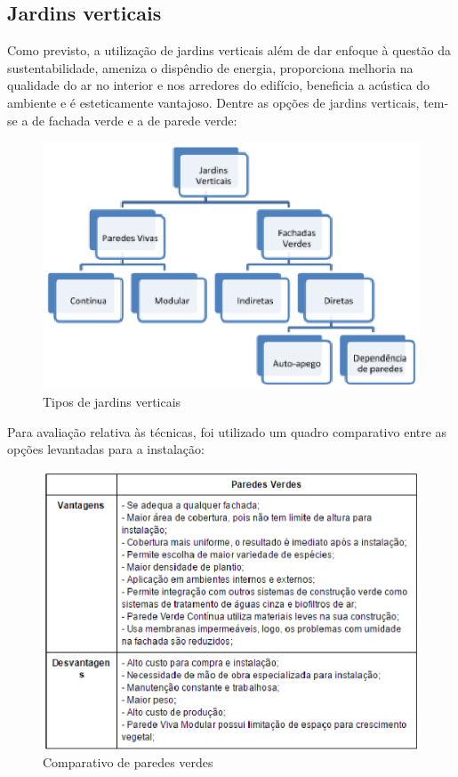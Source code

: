 \subsection{Jardins verticais}
Como previsto, a utilização de jardins verticais além de dar enfoque à questão da sustentabilidade, ameniza o dispêndio de energia, proporciona melhoria na qualidade do ar no interior e nos arredores do edifício, beneficia a acústica do ambiente e é esteticamente vantajoso. Dentre as opções de jardins verticais, tem-se a de fachada verde e a de parede verde:

\begin{figure}[!h]
  \centering
  \includegraphics[keepaspectratio=true,scale=1]{figuras/jardimvertical.eps}
  \caption{Tipos de jardins verticais}
  \label{fig:tipos_jardins_verticais}
\end{figure}

Para avaliação relativa às técnicas, foi utilizado um quadro comparativo entre as opções levantadas para a instalação: 

\begin{figure}[!h]
  \centering
  \includegraphics[keepaspectratio=true,scale=1]{figuras/comparativo_de_paredes_verdes.eps}
  \caption{Comparativo de paredes verdes}
  \label{fig:comparativo_paredes_verdes}
\end{figure}


